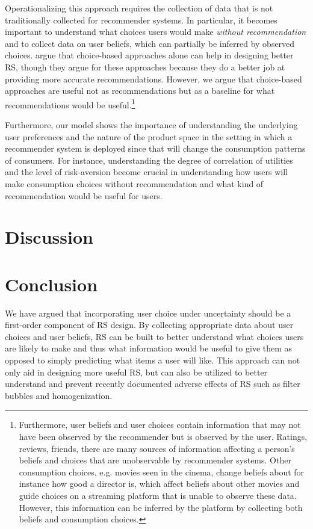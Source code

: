 \documentclass[sigconf]{acmart}
\begin{document}
Operationalizing this approach requires the collection of data that is not traditionally collected for recommender systems. In particular, it becomes important to understand what choices users would make \textit{without recommendation} and to collect data on user beliefs, which can partially be inferred by observed choices. \cite{jiang2014choice, saavedra2016choice} argue that choice-based approaches alone can help in designing better RS, though they argue for these approaches because they do a better job at providing more accurate recommendations. However, we argue that choice-based approaches are useful not as recommendations but as a baseline for what recommendations would be useful.\footnote{Furthermore, user beliefs and user choices contain information that may not have been observed by the recommender but is observed by the user. Ratings, reviews, friends, there are many sources of information affecting a person's beliefs and choices that are unobservable by recommender systems. Other consumption choices, e.g. movies seen in the cinema, change beliefs about for instance how good a director is, which affect beliefs about other movies and guide choices on a streaming platform that is unable to observe these data. However, this information can be inferred by the platform by collecting both beliefs and consumption choices.}

Furthermore, our model shows the importance of understanding the underlying user preferences and the nature of the product space in the setting in which a recommender system is deployed since that will change the consumption patterns of consumers. For instance, understanding the degree of correlation of utilities and the level of risk-aversion become crucial in understanding how users will make consumption choices without recommendation and what kind of recommendation would be useful for users.

\section{Discussion}

\section{Conclusion}

We have argued that incorporating user choice under uncertainty should be a first-order component of RS design. By collecting appropriate data about user choices and user beliefs, RS can be built to better understand what choices users are likely to make and thus what information would be useful to give them as opposed to simply predicting what items a user will like. This approach can not only aid in designing more useful RS, but can also be utilized to better understand and prevent recently documented adverse effects of RS such as filter bubbles and homogenization.



\end{document}

